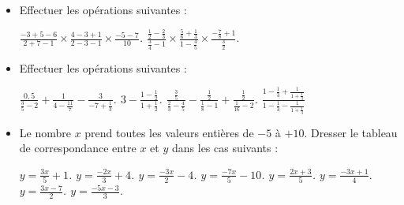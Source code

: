 \begin{itemize}
\begin{itemize}
\end{itemize}
\item Effectuer les opérations suivantes : 
\begin{itemize}
\it $\displaystyle\frac{-3+5-6}{2+7-1}\times\frac{4-3+1}{2-3-1}\times \frac{-5-7}{10}$.
\it $\displaystyle\frac{\frac12-\frac23}{\frac34-1}\times \frac{\frac56+\frac13}{1-\frac45}\times \frac{-\frac78+1}{\frac32}.$
\end{itemize}
\item Effectuer les opérations suivantes : 
\begin{itemize}
\it $\displaystyle\frac{0,5}{\frac35-2}+\frac{1}{4-\frac{11}7}-\frac3{-7+\frac13}$.
\it $\displaystyle 3- \frac{1-\frac12}{1+\frac12}$.
\it $\displaystyle \frac{\frac35}{\frac23-\frac45}-
\frac{\frac12}{\frac18-1}+\frac{\frac12}{\frac1{16}-2}$.
\it $\displaystyle\frac{1-\frac13+\frac1{1+\frac13}}{1-\frac13-\frac1{1+\frac13}}$
\end{itemize}
\item Le nombre $x$ prend toutes les valeurs entières de $-5$ à $+10$. Dresser le tableau de correspondance entre $x$ et $y$ dans les cas suivants : 
\begin{itemize}
\it $\displaystyle y=\frac{3x}5+1$.
\it $\displaystyle y=\frac{-2x}3+4$.
\it $\displaystyle y=\frac{-3x}2-4$.
\it $\displaystyle y=\frac{-7x}5-10$.
\it $\displaystyle y=\frac{2x+3}5$.
\it $\displaystyle y=\frac{-3x+1}4$.
\it $\displaystyle y=\frac{3x-7}2$.
\it $\displaystyle y=\frac{-5x-3}3$.
\end{itemize}
\end{itemize}